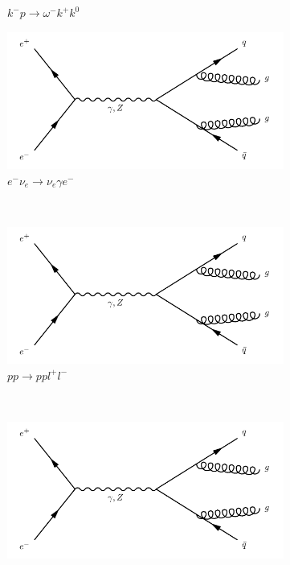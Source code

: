 \begin{figure}[h]
\begin{subfigure}[b]{0.3\textwidth}
    \caption{$k^-p\rightarrow \omega^-k^+k^0$}
    \label{fey:6}
  \end{subfigure}
  \newline
  \newline
  \begin{subfigure}[b]{0.3\textwidth}
    \includegraphics[width=\textwidth]{../Diagrams/D1.pdf}
    \caption{$e^-\nu_e\rightarrow \nu_e \gamma e^-$}
    \label{fey:7}
  \end{subfigure}%
  ~
  \begin{subfigure}[b]{0.3\textwidth}
    \includegraphics[width=\textwidth]{../Diagrams/D1.pdf}
    \caption{$pp\rightarrow ppl^+l^-$}
    \label{fey:8}
  \end{subfigure}%
  ~
  \begin{subfigure}[b]{0.3\textwidth}
    \includegraphics[width=\textwidth]{../Diagrams/D1.pdf}

\end{subfigure}
\end{figure}
